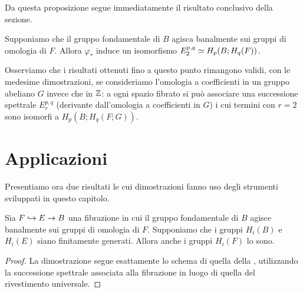 Da questa proposizione segue immediatamente il risultato conclusivo della sezione.
\begin{theorem}
Supponiamo che il gruppo fondamentale di \(B\) agisca banalmente sui gruppi di omologia di \(F\). Allora \(\varphi_*\) induce un isomorfismo \(E^{p,q}_2\simeq H_p(B;H_q(F))\).
\end{theorem}

Osserviamo che i risultati ottenuti fino a questo punto rimangono validi, con le medesime dimostrazioni, se consideriamo l'omologia a coefficienti in un gruppo abeliano \(G\) invece che in \(\mathbb{Z}\): a ogni spazio fibrato si può associare una successione spettrale \(E^{p,q}_r\) (derivante dall'omologia a coefficienti in \(G\)) i cui termini con \(r=2\) sono isomorfi a \(H_p(B;H_q(F;G))\).

\section{Applicazioni}
Presentiamo ora due risultati le cui dimostrazioni fanno uso degli strumenti sviluppati in questo capitolo.

\begin{proposition}
Sia \(F\hookrightarrow E\to B\) una fibrazione in cui il gruppo fondamentale di \(B\) agisce banalmente sui gruppi di omologia di \(F\). Supponiamo che i gruppi \(H_i(B)\) e \(H_i(E)\) siano finitamente generati. Allora anche i gruppi \(H_i(F)\) lo sono.
\end{proposition}
\begin{proof}
La dimostrazione segue esattamente lo schema di quella della , utilizzando la successione spettrale associata alla fibrazione in luogo di quella del rivestimento universale.
\end{proof}

